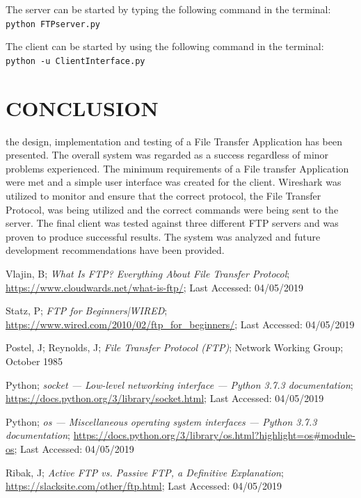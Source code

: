 \documentclass[10pt, conference]{IEEEtran}
\def\code#1{\texttt{#1}}
\begin{document}
The server can be started by typing the following command in the terminal: \code{python FTPserver.py}

The client can be started by using the following command in the terminal: \code{python -u ClientInterface.py}

%
\section{CONCLUSION}
\label{sec: Conclusion}
the design, implementation and testing of a File Transfer Application has been presented. The overall system was regarded as a success regardless of minor problems experienced. The minimum requirements of a File transfer Application were met and a simple user interface was created for the client. Wireshark was utilized to monitor and ensure that the correct protocol, the File Transfer Protocol, was being utilized and the correct commands were being sent to the server. The final client was tested against three different FTP servers and was proven to produce successful results. The system was analyzed and future development recommendations have been provided.


%
\begin{thebibliography}{}


Vlajin, B; \emph{What Is FTP? Everything About File Transfer Protocol}; \url{https://www.cloudwards.net/what-is-ftp/}; Last Accessed: 04/05/2019

Statz, P; \emph{FTP for Beginners|WIRED}; \url{https://www.wired.com/2010/02/ftp_for_beginners/}; Last Accessed: 04/05/2019

Postel, J; Reynolds, J; \emph{File Transfer Protocol (FTP)}; Network Working Group; October 1985

Python; \emph{socket — Low-level networking interface — Python 3.7.3 documentation}; \url{https://docs.python.org/3/library/socket.html}; Last Accessed: 04/05/2019

Python; \emph{os — Miscellaneous operating system interfaces — Python 3.7.3 documentation}; \url{https://docs.python.org/3/library/os.html?highlight=os#module-os}; Last Accessed: 04/05/2019

Ribak, J; \emph{Active FTP vs. Passive FTP, a Definitive Explanation}; \url{https://slacksite.com/other/ftp.html}; Last Accessed: 04/05/2019

\end{thebibliography}
\end{document}
